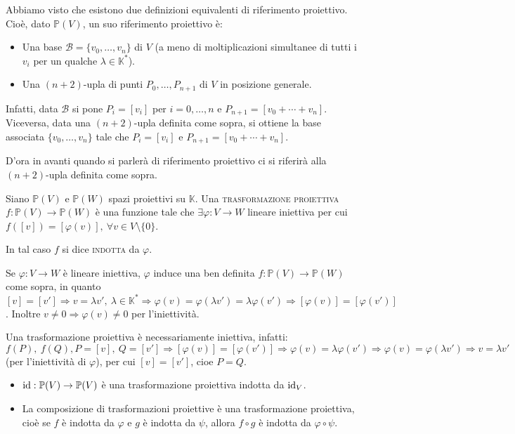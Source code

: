 Abbiamo visto che esistono due definizioni equivalenti di riferimento proiettivo. Cioè, dato $\mathbb{P}(V)$, un suo riferimento proiettivo è:
\begin{itemize}
\item Una base $\mathcal{B}=\{v_0,\dots,v_n\}$ di $V$ (a meno di moltiplicazioni simultanee di tutti i $v_i$ per un qualche $\lambda \in \mathbb{K}^*$).
\item Una $(n+2)$-upla di punti $P_0,\dots,P_{n+1}$ di $V$ in posizione generale.
\end{itemize}
Infatti, data $\mathcal{B}$ si pone $P_i=[v_i]$ per $i=0,\dots,n$ e $P_{n+1}=[v_0+\cdots+v_n]$. Viceversa, data una $(n+2)$-upla definita come sopra, si ottiene la base associata $\{v_0,\dots,v_n\}$ tale che $P_i=[v_i]$ e $P_{n+1}=[v_0+\cdots+v_n]$. 

D'ora in avanti quando si parlerà di riferimento proiettivo ci si riferirà alla $(n+2)$-upla definita come sopra.

\begin{defn}
Siano $\mathbb{P}(V)$ e $\mathbb{P}(W)$ spazi proiettivi su $\mathbb{K}$. Una \textsc{trasformazione proiettiva} $f:\mathbb{P}(V) \rightarrow \mathbb{P}(W)$ è una funzione tale che $\exists \varphi : V \rightarrow W$ lineare iniettiva per cui $f([v])=[\varphi (v)],\ \forall v \in V \setminus \{0\}$.

In tal caso $f$ si dice \textsc{indotta} da $\varphi$.
\end{defn}

\begin{oss}
Se $\varphi :V\rightarrow W$ è lineare iniettiva, $\varphi$ induce una ben definita $f:\mathbb{P}(V)\rightarrow \mathbb{P}(W)$ come sopra, in quanto $[v]=[v'] \Rightarrow v=\lambda v',\ \lambda \in \mathbb{K}^* \Rightarrow \varphi (v)=\varphi (\lambda v')=\lambda \varphi (v') \Rightarrow [\varphi (v)]=[\varphi (v')]$. Inoltre $v\neq 0 \Rightarrow \varphi (v) \neq 0$ per l'iniettività.
\end{oss}

\begin{oss}
Una trasformazione proiettiva è necessariamente iniettiva, infatti: $f(P),\ f(Q), P=[v],\ Q=[v'] \Rightarrow [\varphi (v)]=[\varphi (v')] \Rightarrow \varphi (v)=\lambda \varphi (v') \Rightarrow \varphi (v)=\varphi (\lambda v') \Rightarrow v=\lambda v'$ (per l'iniettività di $\varphi$), per cui $[v]=[v']$, cioe $P=Q$.
\end{oss}

\begin{oss}
\begin{itemize}
\item $\operatorname{id} :\mathbb{P}(V) \rightarrow \mathbb{P}(V)$ è una trasformazione proiettiva indotta da $\operatorname{id} _V$.
\item La composizione di trasformazioni proiettive è una trasformazione proiettiva, cioè se $f$ è indotta da $\varphi$ e $g$ è indotta da $\psi$, allora $f \circ g$ è indotta da $\varphi \circ \psi$.
\end{itemize}
\end{oss}

